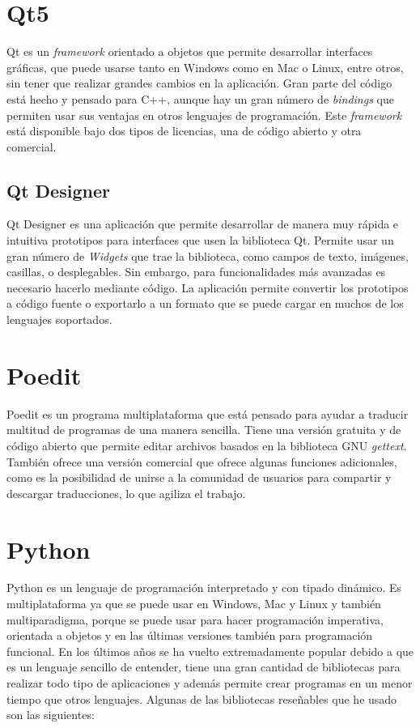 \section{Qt5}
Qt \cite{qt} es un \textit{framework} orientado a objetos que permite desarrollar interfaces gráficas, que puede usarse tanto en Windows como en Mac o Linux, entre otros, sin tener que realizar grandes cambios en la aplicación. Gran parte del código está hecho y pensado para C++, aunque hay un gran número de \textit{bindings} que permiten usar sus ventajas en otros lenguajes de programación. Este \textit{framework} está disponible bajo dos tipos de licencias, una de código abierto y otra comercial.
\subsection{Qt Designer}
Qt Designer \cite{qtcreator} es una aplicación que permite desarrollar de manera muy rápida e intuitiva prototipos para interfaces que usen la biblioteca Qt. Permite usar un gran número de \textit{Widgets} que trae la biblioteca, como campos de texto, imágenes, casillas, o desplegables. Sin embargo, para funcionalidades más avanzadas es necesario hacerlo mediante código. La aplicación permite convertir los prototipos a código fuente o exportarlo a un formato que se puede cargar en muchos de los lenguajes soportados.

\section{Poedit}
Poedit \cite{poedit} es un programa multiplataforma que está pensado para ayudar a traducir multitud de programas de una manera sencilla. Tiene una versión gratuita y de código abierto que permite editar archivos basados en la biblioteca GNU \textit{gettext}. También ofrece una versión comercial que ofrece algunas funciones adicionales, como es la posibilidad de unirse a la comunidad de usuarios para compartir y descargar traducciones, lo que agiliza el trabajo.

\section{Python}
Python \cite{python} es un lenguaje de programación interpretado y con tipado dinámico. Es multiplataforma ya que se puede usar en Windows, Mac y Linux y también multiparadigma, porque se puede usar para hacer programación imperativa, orientada a objetos y en las últimas versiones también para programación funcional.
En los últimos años se ha vuelto extremadamente popular debido a que es un lenguaje sencillo de entender, tiene una gran cantidad de bibliotecas para realizar todo tipo de aplicaciones y además permite crear programas en un menor tiempo que otros lenguajes.
Algunas de las bibliotecas reseñables que he usado son las siguientes:
